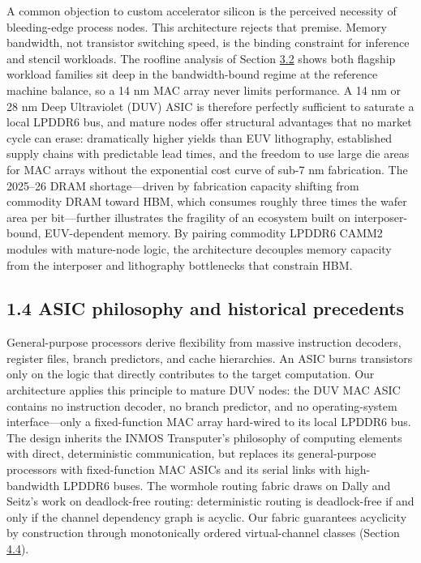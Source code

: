 \documentclass[10pt,twocolumn]{article}
\begin{document}
A common objection to custom accelerator silicon is the perceived necessity of bleeding-edge process nodes. This architecture rejects that premise. Memory bandwidth, not transistor switching speed, is the binding constraint for inference and stencil workloads. The roofline analysis of Section \hyperref[sec:3.2]{3.2} shows both flagship workload families sit deep in the bandwidth-bound regime at the reference machine balance\cite{5}, so a 14 nm MAC array never limits performance. A 14 nm or 28 nm Deep Ultraviolet (DUV) ASIC is therefore perfectly sufficient to saturate a local LPDDR6 bus\cite{17}, and mature nodes offer structural advantages that no market cycle can erase: dramatically higher yields than EUV lithography, established supply chains with predictable lead times, and the freedom to use large die areas for MAC arrays without the exponential cost curve of sub-7 nm fabrication. The 2025--26 DRAM shortage---driven by fabrication capacity shifting from commodity DRAM toward HBM, which consumes roughly three times the wafer area per bit\cite{25}---further illustrates the fragility of an ecosystem built on interposer-bound, EUV-dependent memory. By pairing commodity LPDDR6 CAMM2 modules with mature-node logic, the architecture decouples memory capacity from the interposer and lithography bottlenecks that constrain HBM.

\subsection*{1.4 ASIC philosophy and historical precedents}\label{sec:1.4}

General-purpose processors derive flexibility from massive instruction decoders, register files, branch predictors, and cache hierarchies. An ASIC burns transistors only on the logic that directly contributes to the target computation\cite{10}. Our architecture applies this principle to mature DUV nodes: the DUV MAC ASIC contains no instruction decoder, no branch predictor, and no operating-system interface---only a fixed-function MAC array hard-wired to its local LPDDR6 bus. The design inherits the INMOS Transputer's philosophy of computing elements with direct, deterministic communication\cite{12}, but replaces its general-purpose processors with fixed-function MAC ASICs and its serial links with high-bandwidth LPDDR6 buses. The wormhole routing fabric draws on Dally and Seitz's work on deadlock-free routing: deterministic routing is deadlock-free if and only if the channel dependency graph is acyclic\cite{13,14}. Our fabric guarantees acyclicity by construction through monotonically ordered virtual-channel classes (Section \hyperref[sec:4.4]{4.4}).
\end{document}
